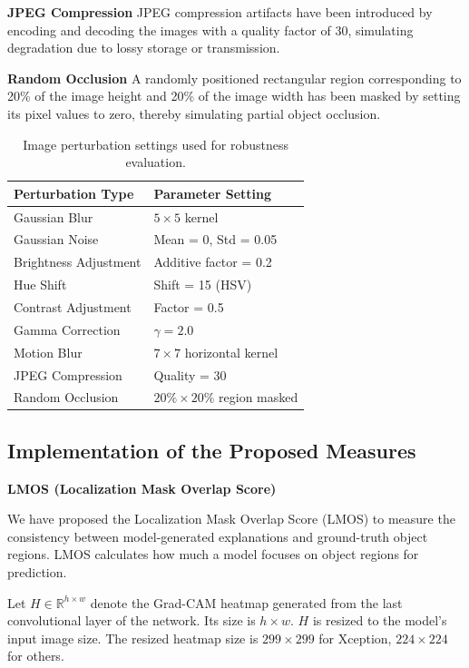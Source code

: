 \documentclass[a4paper,fleqn]{cas-dc}
\begin{document}
\noindent\textbf{JPEG Compression}
JPEG compression artifacts have been introduced by encoding and decoding the images with a quality factor of 30, simulating degradation due to lossy storage or transmission.

\noindent\textbf{Random Occlusion}
A randomly positioned rectangular region corresponding to 20\% of the image height and 20\% of the image width has been masked by setting its pixel values to zero, thereby simulating partial object occlusion.


\begin{table}[h]
\centering
\caption{Image perturbation settings used for robustness evaluation.}
\label{tab:perturbations}

\begin{tabular}{|l|l|}
\hline
\textbf{Perturbation Type} & \textbf{Parameter Setting} \\
\hline
Gaussian Blur & $5 \times 5$ kernel \\
Gaussian Noise & Mean = 0, Std = 0.05 \\
Brightness Adjustment & Additive factor = 0.2 \\
Hue Shift & Shift = 15 (HSV) \\
Contrast Adjustment & Factor = 0.5 \\
Gamma Correction & $\gamma = 2.0$ \\
Motion Blur & $7 \times 7$ horizontal kernel \\
JPEG Compression & Quality = 30 \\
Random Occlusion & $20\% \times 20\%$ region masked \\
\hline
\end{tabular}

\end{table}

\subsection {Implementation of the Proposed Measures}

\noindent\textbf{LMOS (Localization
Mask Overlap Score) }

We have proposed the Localization Mask Overlap Score (LMOS) to measure the consistency between model-generated explanations and ground-truth object regions. LMOS calculates how much a model focuses on object regions for prediction.

Let $H \in \mathbb{R}^{h \times w}$ denote the Grad-CAM heatmap generated from the last convolutional layer of the network. Its size is ${h \times w}$. $H$ is resized to the model's input image size.  The resized heatmap size is  ${299 \times 299}$ for Xception, ${224 \times 224}$ for others.
\end{document}
